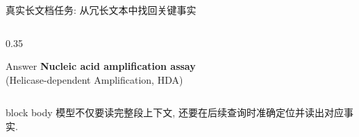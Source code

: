 \begin{frame}{真实长文档任务: 从冗长文本中找回关键事实}
\begin{minipage}{0.92\textwidth}
\begin{columns}[T,onlytextwidth]
\begin{column}{0.35\linewidth}
      \vskip0.20cm
      \begin{block}{Answer}
        \centering
        {\bfseries\color{scured}Nucleic acid amplification assay}\\
        {\scriptsize\color{scured}(Helicase-dependent Amplification, HDA)}
      \end{block}
    \end{column}
  \end{columns}

  \vskip0.34cm
  \begin{beamercolorbox}[sep=5pt,rounded=true,wd=\linewidth]{block body}
    \centering\small
    模型不仅要读完整段上下文, 还要在后续查询时准确定位并读出对应事实.
  \end{beamercolorbox}
  \end{minipage}
\end{frame}

